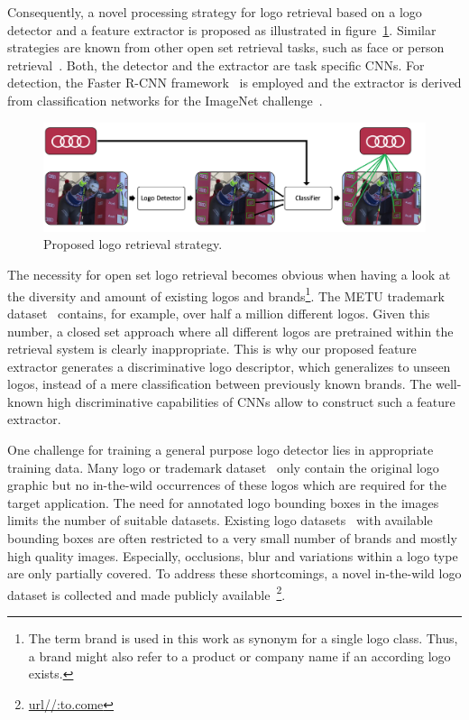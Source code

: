 \documentclass[a4paper,twoside]{article}
\begin{document}
Consequently, a novel processing strategy for logo retrieval based on a logo detector and a feature extractor is proposed as illustrated in figure~\ref{fig:pipeline}. Similar strategies are known from other open set retrieval tasks, such as face or person retrieval~\cite{bauml2010,herrmann2015b}. Both, the detector and the extractor are task specific \acp{CNN}. For detection, the Faster R-CNN framework~\cite{ren2015} is employed and the extractor is derived from classification networks for the ImageNet challenge~\cite{deng2009}.
%
\begin{figure}[!h]
  \centering
  \includegraphics[width=\linewidth]{img/outline.png}
  \caption{Proposed logo retrieval strategy.}
  \label{fig:pipeline}
\end{figure}

The necessity for open set logo retrieval becomes obvious when having a look at the diversity and amount of existing logos and brands\footnote{The term brand is used in this work as synonym for a single logo class. Thus, a brand might also refer to a product or company name if an according logo exists.}. The METU trademark dataset~\cite{tursun2017} contains, for example, over half a million different logos. Given this number, a closed set approach where all different logos are pretrained within the retrieval system is clearly inappropriate.
This is why our proposed feature extractor generates a discriminative logo descriptor, which generalizes to unseen logos, instead of a mere classification between previously known brands. The well-known high discriminative capabilities of \acp{CNN} allow to construct such a feature extractor.

One challenge for training a general purpose logo detector lies in appropriate training data. Many logo or trademark dataset~\cite{eakins1998,tursun2017} only contain the original logo graphic but no in-the-wild occurrences of these logos which are required for the target application. The need for annotated logo bounding boxes in the images limits the number of suitable datasets. Existing logo datasets~\cite{joly2009,kalantidis2011,romberg2011,letessier2012,bianco2015,su2016,bianco2017} with available bounding boxes are often restricted to a very small number of brands and mostly high quality images. Especially, occlusions, blur and variations within a logo type are only partially covered.
To address these shortcomings, a novel in-the-wild logo dataset is collected and made publicly available~\footnote{\url{url//:to.come}}.
\end{document}

